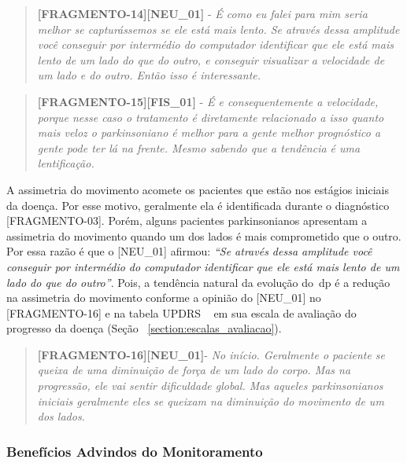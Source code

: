 \begin{quote}
\textbf{[FRAGMENTO-14][NEU\_01]} - 
\emph{
É como eu falei para mim seria melhor se capturássemos se ele está mais lento. Se através dessa amplitude você conseguir por intermédio do computador identificar que ele está mais lento de um lado do que do outro, e conseguir visualizar a velocidade de um lado e do outro. Então isso é interessante.
}
\end{quote}


\begin{quote}
\textbf{[FRAGMENTO-15][FIS\_01]} - 
\emph{
É e consequentemente a velocidade, porque nesse caso o tratamento é diretamente relacionado a isso quanto mais veloz o parkinsoniano é melhor para a gente melhor prognóstico a gente pode ter lá na frente. Mesmo sabendo que a tendência é uma lentificação.
}
\end{quote}


A assimetria do movimento acomete os pacientes que estão nos estágios iniciais da doença. Por esse motivo, geralmente ela é identificada durante o diagnóstico [FRAGMENTO-03]. Porém, alguns pacientes parkinsonianos apresentam a assimetria do movimento quando um dos lados é mais comprometido que o outro. Por essa razão é que o [NEU\_01] afirmou: \textit{``Se através dessa amplitude você conseguir por intermédio do computador identificar que ele está mais lento de um lado do que do outro''}. Pois, a tendência natural da evolução do~\ac{dp} é a redução na assimetria do movimento conforme a opinião do [NEU\_01] no [FRAGMENTO-16] e na tabela UPDRS ~\cite{updrs87} em sua escala de avaliação do progresso da doença (Seção ~\ref{section:escalas_avaliacao}).

\begin{quote}
\textbf{[FRAGMENTO-16][NEU\_01]}-
\emph{
No início. Geralmente o paciente se queixa de uma diminuição de força de um lado do corpo. Mas na progressão, ele vai sentir dificuldade global. Mas aqueles parkinsonianos iniciais geralmente eles se queixam na diminuição do movimento de um dos lados.
}
\end{quote}

\subsubsection{Benefícios Advindos do Monitoramento}


